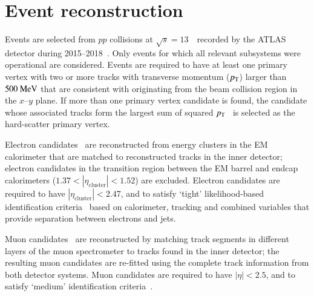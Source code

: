 \section{Event reconstruction}
\label{sec:objects}

Events are selected from $pp$ collisions at $\sqrt{s}=13$~\TeV\ recorded by the ATLAS detector during 2015--2018~\cite{DAPR-2018-01}.
Only events for which all relevant subsystems were operational are considered.
Events are required to have at least one primary vertex with two or more tracks with transverse momentum
($p_{\text{T}}$) larger than $500~\text{MeV}$ that are consistent with originating from the 
beam collision region in the $x$--$y$ plane. If more than one primary vertex candidate is found, the
candidate whose associated tracks form the largest sum of squared $p_{\text{T}}$~\cite{ATL-PHYS-PUB-2015-026}
is selected as the hard-scatter primary vertex.

Electron candidates~\cite{EGAM-2018-01} are reconstructed from energy 
clusters in the EM calorimeter that are matched to reconstructed tracks in the inner detector;
electron candidates in the transition region between the EM barrel and endcap calorimeters 
($1.37 < |\eta_{\textrm{cluster}}| < 1.52$) are excluded.
Electron candidates are required to have $|\eta_{\textrm{cluster}}| < 2.47$, and to satisfy `tight' likelihood-based identification 
criteria~\cite{PERF-2017-01}
based on calorimeter, tracking and combined variables that provide 
separation between electrons and jets. 

Muon candidates~\cite{MUON-2018-03} are reconstructed by matching track segments in %
different layers of the muon spectrometer to tracks found in the inner detector;
the resulting muon candidates are re-fitted using the complete track information from both detector systems.
Muon candidates are required to have $|\eta|<2.5$, and to satisfy `medium' identification criteria~\cite{Aad:2016jkr}. 

